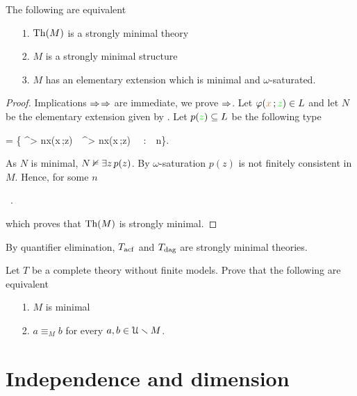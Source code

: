 \begin{proposition}\label{prop_fmequivalenzadefinizioni}
The following are equivalent
\begin{itemize}
\item[1.] ${\rm Th}(M)$ is a strongly minimal theory
\item[2.] $M$ is a strongly minimal structure
\item[3.] $M$ has an elementary extension which is minimal and $\omega$-saturated.
\end{itemize}
\end{proposition}
\begin{proof}
Implications $\Rightarrow$$\Rightarrow$ are immediate, we prove $\Rightarrow$.
Let $\varphi({\color{brown} x}\,;{\color{green} z})\in L$ and let $N$ be the elementary extension given by .
Let $p({\color{green} z})\subseteq L$ be the following type

{=}
{\Big\{ \E^{> n}{\mr x}\;\phi({\mr x}\,;{\gr z})\ \wedge\ \E^{> n}{\mr x}\;\neg\phi({\mr x}\,;{\gr z}) \ \ :\ \ n\in\omega\Big\}.}

As $N$ is minimal, $N\nvDash \exists z\,p(z)$.
By $\omega$-saturation $p(z)$ is not finitely consistent in $M$.
Hence, for some $n$ 

{\models}
{\ .}

which proves that ${\rm Th}(M)$ is strongly minimal.
\end{proof}

By quantifier elimination, $T_{\rm acf}$ and $T_{\rm dag}$ are strongly minimal theories.

\begin{exercise}\label{ex_minimal_models}
Let $T$ be a complete theory without finite models.
Prove that the following are equivalent
\begin{itemize}
\item[1.] $M$ is minimal
\item[2.] $a\equiv_M b$ for every $a, b\in \EuScript U\smallsetminus M$.
\end{itemize}
\end{exercise}



\section{Independence and dimension}
\def\medrel#1{\parbox[t]{5ex}{$\displaystyle\hfil #1$}}
\def\ceq#1#2#3{\parbox{35ex}{$\displaystyle #1$}\medrel{#2}$\displaystyle  #3$}



